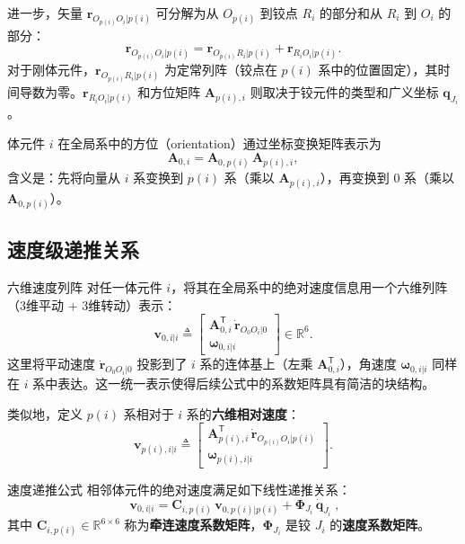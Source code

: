 \documentclass[10pt,a4paper]{book}
\theoremstyle{thmstyle}
\theoremstyle{defstyle}
\theoremstyle{prostyle}
\newcommand{\T}{^{\mathsf{T}}}
\renewcommand{\vec}[1]{\bm{#1}}
\newcommand{\mat}[1]{\bm{#1}}
\newcommand{\R}{\mathbb{R}}
\begin{document}
进一步，矢量 $\vec{r}_{O_{p(i)}O_i|p(i)}$ 可分解为从 $O_{p(i)}$ 到铰点 $R_i$ 的部分和从 $R_i$ 到 $O_i$ 的部分：
\begin{equation}
\vec{r}_{O_{p(i)}O_i|p(i)} = \vec{r}_{O_{p(i)}R_i|p(i)} + \vec{r}_{R_iO_i|p(i)}.
\label{eq:pos_decompose}
\end{equation}
对于刚体元件，$\vec{r}_{O_{p(i)}R_i|p(i)}$ 为定常列阵（铰点在 $p(i)$ 系中的位置固定），其时间导数为零。$\vec{r}_{R_iO_i|p(i)}$ 和方位矩阵 $\mat{A}_{p(i),i}$ 则取决于铰元件的类型和广义坐标 $\vec{q}_{J_i}$。

体元件 $i$ 在全局系中的方位（orientation）通过坐标变换矩阵表示为
\begin{equation}
\mat{A}_{0,i} = \mat{A}_{0,p(i)}\,\mat{A}_{p(i),i},
\label{eq:orient_recur}
\end{equation}
含义是：先将向量从 $i$ 系变换到 $p(i)$ 系（乘以 $\mat{A}_{p(i),i}$），再变换到 $0$ 系（乘以 $\mat{A}_{0,p(i)}$）。

\subsection{速度级递推关系}

\begin{mydefinition}{六维速度列阵}
对任一体元件 $i$，将其在全局系中的绝对速度信息用一个六维列阵（3维平动 + 3维转动）表示：
\begin{equation}
\vec{v}_{0,i|i} \triangleq
\begin{bmatrix}
\mat{A}_{0,i}\T\,\dot{\vec{r}}_{O_0O_i|0} \\
\vec{\omega}_{0,i|i}
\end{bmatrix}\in\R^6.
\label{eq:six_dim_vel}
\end{equation}
这里将平动速度 $\dot{\vec{r}}_{O_0O_i|0}$ 投影到了 $i$ 系的连体基上（左乘 $\mat{A}_{0,i}\T$），角速度 $\vec{\omega}_{0,i|i}$ 同样在 $i$ 系中表达。这一统一表示使得后续公式中的系数矩阵具有简洁的块结构。
\end{mydefinition}

类似地，定义 $p(i)$ 系相对于 $i$ 系的\textbf{六维相对速度}：
\begin{equation}
\vec{v}_{p(i),i|i} \triangleq
\begin{bmatrix}
\mat{A}_{p(i),i}\T\,\dot{\vec{r}}_{O_{p(i)}O_i|p(i)} \\
\vec{\omega}_{p(i),i|i}
\end{bmatrix}.
\label{eq:rel_vel}
\end{equation}

\begin{myTheorem}{速度递推公式}
相邻体元件的绝对速度满足如下线性递推关系：
\begin{equation}
\boxed{\;\vec{v}_{0,i|i} = \mat{C}_{i,p(i)}\,\vec{v}_{0,p(i)|p(i)} + \mat{\Phi}_{J_i}\,\dot{\vec{q}}_{J_i}\;},
\label{eq:vel_recur}
\end{equation}
其中 $\mat{C}_{i,p(i)}\in\R^{6\times 6}$ 称为\textbf{牵连速度系数矩阵}，$\mat{\Phi}_{J_i}$ 是铰 $J_i$ 的\textbf{速度系数矩阵}。
\end{myTheorem}
\end{document}
